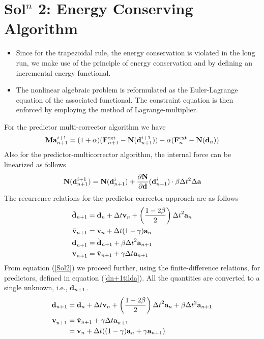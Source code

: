 \section*{Sol$^n$ 2: Energy Conserving Algorithm}
\begin{itemize}
\item Since for the trapezoidal rule, the energy conservation is violated in the long run, we make use of the principle of energy conservation and by defining an incremental energy functional. 
\item The nonlinear algebraic problem is reformulated as the Euler-Lagrange equation of the associated functional. The constraint equation is then enforced by employing the method of Lagrange-multiplier. 
\end{itemize}
For the predictor multi-corrector algorithm we have
\begin{align}
{\bf M}{\bf a}^{i+1}_{n+1} 
= 
(1+\alpha)({\bf F}^{\rm ext}_{n+1} - {\bf N}({\bf d}^{i+1}_{n+1})) - \alpha ({\bf F}^{\rm ext}_n - {\bf N}({\bf d}_n))
\label{Sol2}
\end{align} 
Also for the predictor-multicorrector algorithm, the internal force can be linearized as follows
\begin{align*}
{\bf N}({\bf d}^{i+1}_{n+1})
=
{\bf N}({\bf d}^{i}_{n+1})
+ \frac{\partial {{\bf N}}}{\partial {\bf d}} ({\bf d}^{i}_{n+1}) \cdot {\beta\Delta t ^2 \Delta {\bf a}}
\end{align*}
The recurrence relations for the predictor corrector approach are as follows
\begin{align}
\begin{split}
\tilde{\bf d}_{n+1}
& =
{\bf d}_n + \Delta t {\bf v}_n + \left(\frac{1-2\beta}{2}\right){\Delta t}^2 {\bf a}_n \\
\tilde{\bf v}_{n+1}
& =
{\bf v}_n
+ \Delta t (1-\gamma){\bf a}_{n} \\
{\bf d}^{}_{n+1} 
& =  \tilde{\bf d}_{n+1}
+ \beta {\Delta t}^2 {\bf a}_{n+1} \\
{\bf v}^{}_{n+1}
& =
\tilde{\bf v}_{n+1} + \gamma \Delta t {\bf a}_{n+1}
\end{split}
\label{dn+1tilda}
\end{align}
From equation (\ref{Sol2}) we proceed further, using the finite-difference relations, for predictors, defined in equation (\ref{dn+1tilda}). All the quantities are converted to a single unknown, i.e., ${\bf d}_{n+1}$. 
\begin{align*}
{\bf d}_{n+1} 
& =
{\bf d}_n + \Delta t {\bf v}_n + \left(\frac{1-2\beta}{2}\right){\Delta t}^2 {\bf a}_n + \beta \Delta t^2 {\bf a}_{n+1}\\
{\bf v}^{}_{n+1}
& =
\tilde{\bf v}_{n+1} + \gamma \Delta t {\bf a}^{}_{n+1}\\
& = 
{\bf v}_n + \Delta t ((1-\gamma){\bf a}_n + \gamma {\bf a}_{n+1}) 
\end{align*}
